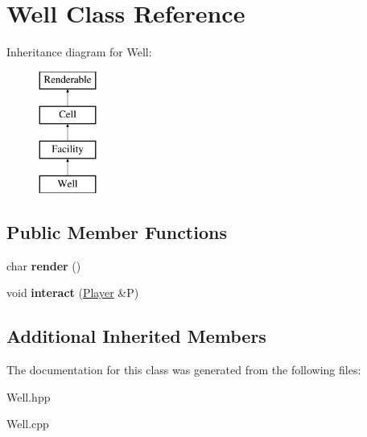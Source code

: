 \hypertarget{class_well}{}\section{Well Class Reference}
\label{class_well}
Inheritance diagram for Well\+:\begin{figure}[H]
\begin{center}
\leavevmode
\includegraphics[height=4.000000cm]{class_well}
\end{center}
\end{figure}
\subsection*{Public Member Functions}
\begin{DoxyCompactItemize}
\item 
\mbox{\label{class_well_a69b55113e60627af17e1965fb54356e7}} 
char {\bfseries render} ()
\item 
\mbox{\label{class_well_a224abe167edd6e91f1b017ae1aa192b2}} 
void {\bfseries interact} (\mbox{\hyperlink{class_player}{Player}} \&P)
\end{DoxyCompactItemize}
\subsection*{Additional Inherited Members}


The documentation for this class was generated from the following files\+:\begin{DoxyCompactItemize}
\item 
Well.\+hpp\item 
Well.\+cpp\end{DoxyCompactItemize}
